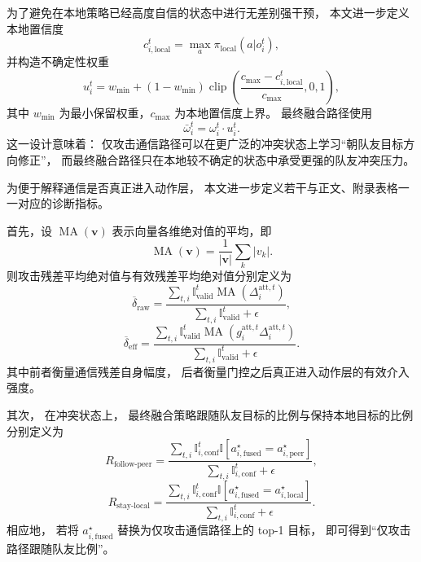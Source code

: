 为了避免在本地策略已经高度自信的状态中进行无差别强干预，
本文进一步定义本地置信度
\begin{equation}
c_{i,\text{local}}^t
=
\max_a \pi_{\text{local}}(a|o_i^t),
\end{equation}
并构造不确定性权重
\begin{equation}
u_i^t
=
w_{\min}
+
(1-w_{\min})
\operatorname{clip}
\left(
\frac{c_{\max}-c_{i,\text{local}}^t}{c_{\max}},
0,1
\right),
\end{equation}
其中 \(w_{\min}\) 为最小保留权重，\(c_{\max}\) 为本地置信度上界。
最终融合路径使用
\begin{equation}
\bar{\omega}_i^t
=
\omega_i^t \cdot u_i^t .
\end{equation}
这一设计意味着：
仅攻击通信路径可以在更广泛的冲突状态上学习“朝队友目标方向修正”，
而最终融合路径只在本地较不确定的状态中承受更强的队友冲突压力。


为便于解释通信是否真正进入动作层，
本文进一步定义若干与正文、附录表格一一对应的诊断指标。

首先，设 \(\operatorname{MA}(\mathbf{v})\) 表示向量各维绝对值的平均，即
\begin{equation}
\operatorname{MA}(\mathbf{v})
=
\frac{1}{|\mathbf{v}|}
\sum_k |v_k|.
\end{equation}
则攻击残差平均绝对值与有效残差平均绝对值分别定义为
\begin{equation}
\overline{\delta}_{\text{raw}}
=
\frac{
\sum_{t,i}\mathbb{I}_{\text{valid}}^t
\operatorname{MA}(\Delta_i^{\text{att},t})
}{
\sum_{t,i}\mathbb{I}_{\text{valid}}^t + \epsilon
},
\end{equation}
\begin{equation}
\overline{\delta}_{\text{eff}}
=
\frac{
\sum_{t,i}\mathbb{I}_{\text{valid}}^t
\operatorname{MA}(g_i^{\text{att},t}\Delta_i^{\text{att},t})
}{
\sum_{t,i}\mathbb{I}_{\text{valid}}^t + \epsilon
}.
\end{equation}
其中前者衡量通信残差自身幅度，
后者衡量门控之后真正进入动作层的有效介入强度。

其次，
在冲突状态上，
最终融合策略跟随队友目标的比例与保持本地目标的比例分别定义为
\begin{equation}
R_{\text{follow-peer}}
=
\frac{
\sum_{t,i}
\mathbb{I}_{i,\text{conf}}^t
\mathbb{I}
\left[
a_{i,\text{fused}}^\star
=
a_{i,\text{peer}}^\star
\right]
}{
\sum_{t,i}\mathbb{I}_{i,\text{conf}}^t + \epsilon
},
\end{equation}
\begin{equation}
R_{\text{stay-local}}
=
\frac{
\sum_{t,i}
\mathbb{I}_{i,\text{conf}}^t
\mathbb{I}
\left[
a_{i,\text{fused}}^\star
=
a_{i,\text{local}}^\star
\right]
}{
\sum_{t,i}\mathbb{I}_{i,\text{conf}}^t + \epsilon
}.
\end{equation}
相应地，
若将 \(a_{i,\text{fused}}^\star\) 替换为仅攻击通信路径上的 top-1 目标，
即可得到“仅攻击路径跟随队友比例”。


